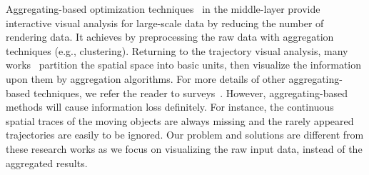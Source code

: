 Aggregating-based optimization techniques~\cite{zeng2013visualizing,von2015mobilitygraphs} in the middle-layer provide interactive visual analysis for large-scale data by
reducing the number of rendering data.
It achieves by preprocessing the raw data with aggregation techniques (e.g., clustering).
Returning to the trajectory visual analysis,
many works~\cite{wood2010visualisation,guo2009flow,von2015mobilitygraphs} partition the spatial space into basic units,
then visualize the information upon them by aggregation algorithms.
For more details of other aggregating-based techniques, we refer the reader to surveys~\cite{xxx}.
However, aggregating-based methods will cause information loss definitely.
For instance, the continuous spatial traces of the moving objects are always missing and the rarely appeared trajectories are easily to be ignored.
Our problem and solutions are different from these research works as we focus on visualizing the raw input data, instead of the aggregated results.


